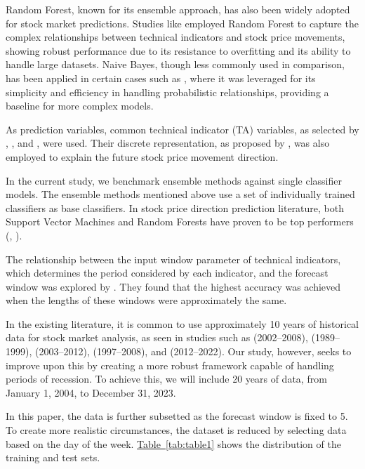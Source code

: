 \documentclass[aodsor,preprint]{imsart}
\numberwithin{equation}{section}
\theoremstyle{plain}
\begin{document}
Random Forest, known for its ensemble approach, has also been widely adopted for stock market predictions. Studies like \cite{patel2015} employed Random Forest to capture the complex relationships between technical indicators and stock price movements, showing robust performance due to its resistance to overfitting and its ability to handle large datasets. Naive Bayes, though less commonly used in comparison, has been applied in certain cases such as \cite{henrique2023}, where it was leveraged for its simplicity and efficiency in handling probabilistic relationships, providing a baseline for more complex models.

As prediction variables, common technical indicator (TA) variables, as selected by \cite{Kara2011}, \cite{patel2015}, and \cite{henrique2023}, were used. Their discrete representation, as proposed by \cite{patel2015}, was also employed to explain the future stock price movement direction.

In the current study, we benchmark ensemble methods against single classifier models. The ensemble methods mentioned above use a set of individually trained classifiers as base classifiers. In stock price direction prediction literature, both Support Vector Machines and Random Forests have proven to be top performers (\cite{kumar2006}, \cite{patel2015}).

The relationship between the input window parameter of technical indicators, which determines the period considered by each indicator, and the forecast window was explored by \cite{shynkevich2017}. They found that the highest accuracy was achieved when the lengths of these windows were approximately the same.

In the existing literature, it is common to use approximately 10 years of historical data for stock market analysis, as seen in studies such as \cite{shynkevich2017} (2002–2008), \cite{kim2003} (1989–1999), \cite{patel2015} (2003–2012), \cite{Kara2011} (1997–2008), and \cite{ayyildiz2024} (2012–2022). Our study, however, seeks to improve upon this by creating a more robust framework capable of handling periods of recession. To achieve this, we will include 20 years of data, from January 1, 2004, to December 31, 2023.

In this paper, the data is further subsetted as the forecast window is fixed to 5. To create more realistic circumstances, the dataset is reduced by selecting data based on the day of the week. \hyperref[tab:table1]{Table~\ref*{tab:table1}} shows the distribution of the training and test sets.
\end{document}
